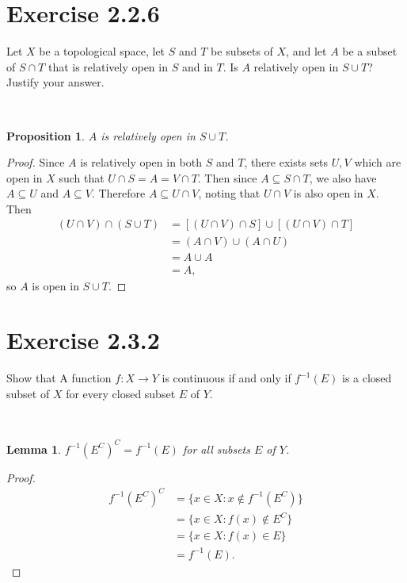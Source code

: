 \documentclass[12pt]{article}
\newtheorem{lemma}{Lemma}
\newtheorem{proposition}{Proposition}
\newenvironment{problem}
    {\begin{lrbox}{\mybox}\begin{minipage}{\textwidth-10pt}}
    {\end{minipage}\end{lrbox}\framebox[6.5in]{\usebox{\mybox}}\\}
\begin{document}
\newpage
\section*{Exercise 2.2.6}
\begin{problem}
    Let $X$ be a topological space, let $S$ and $T$ be subsets of $X$, and let $A$ be a subset of $S\cap T$ that is relatively open in $S$ and in $T$. Is $A$ relatively open in $S\cup T$? Justify your answer.
\end{problem}

\begin{proposition}
    $A$ is relatively open in $S\cup T$.
\end{proposition}

\begin{proof}
    Since $A$ is relatively open in both $S$ and $T$, there exists sets $U,V$ which are open in $X$ such that $U\cap S = A = V \cap T$. Then since $A\subseteq S\cap T$, we also have $A\subseteq U$ and $A\subseteq V$. Therefore $A\subseteq U\cap V$, noting that $U\cap V$ is also open in $X$. Then
    \begin{align*}
        (U\cap V) \cap (S\cup T)
            &=  [(U\cap V) \cap S] \cup [(U\cap V) \cap T] \\
            &= (A\cap V) \cup (A\cap U) \\
            &= A\cup A \\
            &= A,
    \end{align*}
    so $A$ is open in $S\cup T$.
    
\end{proof}

\section*{Exercise 2.3.2}
\begin{problem}
    Show that A function $f:X\to Y$ is continuous if and only if $f^{-1}(E)$ is a closed subset of $X$ for every closed subset $E$ of $Y$.
\end{problem}

\begin{lemma}
    $f^{-1}(E^C)^C = f^{-1}(E)$ for all subsets $E$ of $Y$.
\end{lemma}

\begin{proof}
    \begin{align*}
        f^{-1}(E^C)^C
            &= \{x\in X : x\notin f^{-1}(E^C)\} \\
            &= \{x\in X : f(x) \notin E^C\} \\
            &= \{x\in X: f(x) \in E\} \\
            &= f^{-1}(E).
    \end{align*}
\end{proof}
\end{document}
